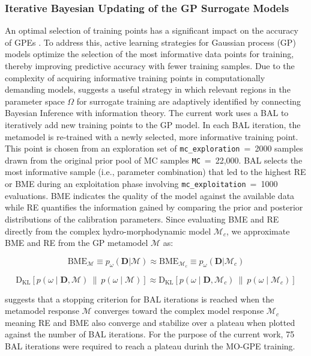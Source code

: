 \documentclass[draft,linenumbers,onecolumn]{agujournal2019} %
\begin{document}
\subsubsection{Iterative Bayesian Updating of the GP Surrogate Models}
\label{sec:mo-gpe}
An optimal selection of training points has a significant impact on the accuracy of GPEs \cite{sinsbeck2017sequential}. To address this, active learning strategies for Gaussian process (GP) models optimize the selection of the most informative data points for training, thereby improving predictive accuracy with fewer training samples. Due to the complexity of acquiring informative training points in computationally demanding models,  suggests a useful strategy in which relevant regions in the parameter space $\Omega$ for surrogate training are adaptively identified by connecting Bayesian Inference with information theory. The current work uses a BAL \cite{oladyshkin2020bayesian3} to iteratively add new training points to the GP model. In each BAL iteration, the metamodel is re-trained with a newly selected, more informative training point. This point is chosen from an exploration set of \texttt{mc\_exploration}~=~2000 samples drawn from the original prior pool of MC samples \texttt{MC}~=~22,000. BAL selects the most informative sample (i.e., parameter combination) that led to the highest RE or BME during an exploitation phase involving \texttt{mc\_exploitation}~=~1000 evaluations. BME indicates the quality of the model against the available data while RE quantifies the information gained by comparing the prior and posterior distributions of the calibration parameters. Since evaluating BME and RE directly from the complex hydro-morphodynamic model $\mathcal{M}_c$, we approximate BME and RE from the GP metamodel $\mathcal{M}$ as:

\begin{equation} \label{eq:bme}
	\text{BME}_{\mathcal{M}} \equiv p_{\omega}(\mathbf{D}|\mathcal{M}) \approx \text{BME}_{\mathcal{M}_c} \equiv p_{\omega}(\mathbf{D}|\mathcal{M}_c)
\end{equation}

\begin{equation} \label{eq:re}
	\text{D}_{\text{KL}}\left[ p(\omega \mid \mathbf{D}, \mathcal{M}) ~\|~ p(\omega \mid \mathcal{M}) \right] \approx \text{D}_{\text{KL}}\left[ p(\omega \mid \mathbf{D}, \mathcal{M}_c) ~\|~ p(\omega \mid \mathcal{M}_c) \right]
\end{equation}

 suggests that a stopping criterion for BAL iterations is reached when the metamodel response $\mathcal{M}$ converges toward the complex model response $\mathcal{M}_c$ meaning RE and BME also converge and stabilize over a plateau when plotted against the number of BAL iterations. For the purpose of the current work, 75 BAL iterations were required to reach a plateau durinh the MO-GPE training. 
\end{document}
